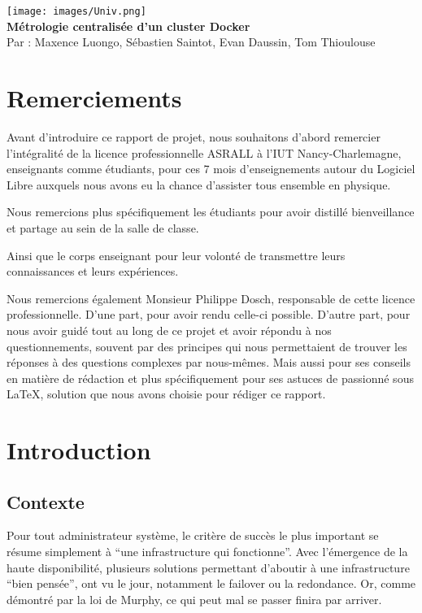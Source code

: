 \documentclass[oneside,12pt]{report}
\begin{document}
\thispagestyle{empty}
\begin{center}
  \texttt{[image: images/Univ.png]}\\[8cm]
  {\huge{\textbf{Métrologie centralisée d'un cluster Docker}}}\\[1cm]
  {\Large{Par : Maxence Luongo, Sébastien Saintot, Evan Daussin, Tom Thioulouse}}\\[1cm]
\end{center}

\pagestyle{fancy}

\tableofcontents
\chapter{Remerciements}

Avant d'introduire ce rapport de projet, nous souhaitons d'abord remercier l'intégralité de la licence professionnelle ASRALL à l'IUT Nancy-Charlemagne, enseignants comme étudiants, pour ces 7 mois d'enseignements autour du Logiciel Libre auxquels nous avons eu la chance d'assister tous ensemble en physique. \newline

Nous remercions plus spécifiquement les étudiants pour avoir distillé bienveillance et partage au sein de la salle de classe. \newline

Ainsi que le corps enseignant pour leur volonté de transmettre leurs connaissances et leurs expériences. \newline

Nous remercions également Monsieur Philippe Dosch, responsable de cette licence professionnelle. D'une part, pour avoir rendu celle-ci possible. D'autre part, pour nous avoir guidé tout au long de ce projet et avoir répondu à nos questionnements, souvent par des principes qui nous permettaient de trouver les réponses à des questions complexes par nous-mêmes. Mais aussi pour ses conseils en matière de rédaction et plus spécifiquement pour ses astuces de passionné sous LaTeX, solution que nous avons choisie pour rédiger ce rapport. \newline

\chapter{Introduction}

\section{Contexte}
Pour tout administrateur système, le critère de succès le plus important se résume simplement à “une infrastructure qui fonctionne”. Avec l'émergence de la haute disponibilité, plusieurs solutions permettant d'aboutir à une infrastructure “bien pensée”, ont vu le jour, notamment le failover ou la redondance. Or, comme démontré par la loi de Murphy, ce qui peut mal se passer finira par arriver. \newline
\end{document}
